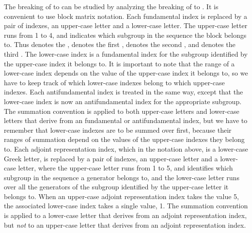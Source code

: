 \documentclass[a4paper,12pt,oneside]{article}
\begin{document}
The breaking of \coordHE{} to \coordHE{} can 
be studied by analyzing the breaking of
\coordHE{} to \coordHE{}.  It 
is convenient to use block matrix notation.
Each \coordHE{} fundamental index is replaced by a pair of
indexes, an upper-case letter and a lower-case letter.  The 
upper-case letter runs from 1 to 4, and indicates which subgroup in
the sequence \coordHE{} the block belongs to.  
Thus \coordHE{} denotes the \coordHE{}, \coordHE{} denotes the first
\coordHE{}, \coordHE{} denotes the second \coordHE{}, and \coordHE{} denotes the
third \coordHE{}.  The lower-case index is a fundamental index for the
subgroup identified by the upper-case index it belongs to.  It is
important to note that the range of a lower-case index depends on 
the value of the upper-case index it belongs to, so we have to keep
track of which lower-case indexes belong to which upper-case 
indexes.  Each \coordHE{} antifundamental index is treated in 
the
same way, except that the lower-case index is now an antifundamental
index for the appropriate subgroup.  The summation convention is
applied to both upper-case letters and lower-case letters that 
derive from an \coordHE{} fundamental or antifundamental 
index, but we have to remember that lower-case indexes are to be 
summed over first, because their ranges of summation depend on the
values of the upper-case indexes they belong to.  Each 
\coordHE{} adjoint representation index, which in the notation
above, is a lower-case Greek letter, is replaced by a pair of 
indexes, an
upper-case letter and a lower-case letter, where the upper-case 
letter runs from 1 to 5, and identifies which subgroup in the 
sequence \coordHE{} a 
generator belongs to, and the lower-case 
letter runs over all the
generators of the subgroup identified by the upper-case letter it
belongs to.  When an upper-case adjoint representation index takes 
the value 5, the associated lower-case index takes a single
value, 1.  The summation convention is applied to a lower-case
letter that derives from an \coordHE{} adjoint representation
index, but \emph{not} to an upper-case letter that derives from an
\coordHE{} adjoint representation index.
\end{document}
